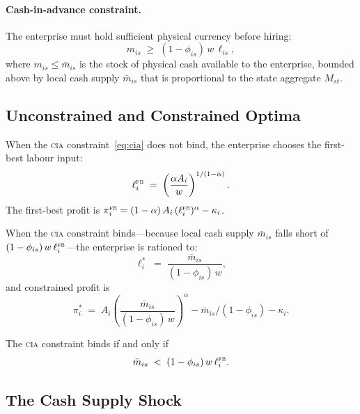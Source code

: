 \paragraph{Cash-in-advance constraint.}
The enterprise must hold sufficient physical currency before hiring:
\begin{equation}
  m_{is} \;\geq\; (1-\phi_{is})\, w\,\ell_{is},
  \label{eq:cia}
\end{equation}
where $m_{is} \leq \bar{m}_{is}$ is the stock of physical cash available
to the enterprise, bounded above by local cash supply $\bar{m}_{is}$ that is
proportional to the state aggregate $M_{st}$.

\subsection{Unconstrained and Constrained Optima}

When the \textsc{cia} constraint~\eqref{eq:cia} does not bind, the enterprise
chooses the first-best labour input:
\begin{equation}
  \ell_i^{\textsc{fb}} \;=\;
    \left(\frac{\alpha A_i}{w}\right)^{1/(1-\alpha)}.
  \label{eq:lfb}
\end{equation}
The first-best profit is
$\pi_i^{\textsc{fb}} = (1-\alpha)\,A_i\,(\ell_i^{\textsc{fb}})^{\alpha} - \kappa_i$.

When the \textsc{cia} constraint binds---because local cash supply
$\bar{m}_{is}$ falls short of $(1-\phi_{is})\,w\,\ell_i^{\textsc{fb}}$---the
enterprise is rationed to:
\begin{equation}
  \ell_i^{*} \;=\;
    \frac{\bar{m}_{is}}{(1-\phi_{is})\,w},
  \label{eq:lconstrained}
\end{equation}
and constrained profit is
\begin{equation}
  \pi_i^{*} \;=\;
    A_i\!\left(\frac{\bar{m}_{is}}{(1-\phi_{is})\,w}\right)^{\!\alpha}
    - \bar{m}_{is}/(1-\phi_{is}) - \kappa_i.
  \label{eq:profit_constrained}
\end{equation}

The \textsc{cia} constraint binds if and only if
\begin{equation}
  \bar{m}_{is} \;<\; (1-\phi_{is})\,w\,\ell_i^{\textsc{fb}}.
  \label{eq:binding_condition}
\end{equation}

\subsection{The Cash Supply Shock}

